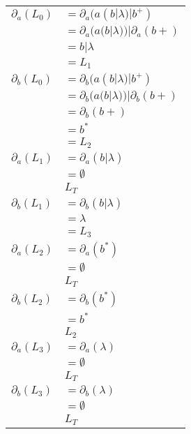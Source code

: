\subsubsection{}
\begin{tabular}{l l}
	$\partial_a(L_0)$ & $= \partial_a(a(b|\lambda)|b^+)$ \\
					  & $= \partial_a(a(b|\lambda)) | \partial_a(b+)$ \\
					  & $= b | \lambda $ \\
					  & $= L_1$ \\

	$\partial_b(L_0)$ & $= \partial_b(a(b|\lambda)|b^+)$ \\
					  & $= \partial_b(a(b|\lambda)) | \partial_b(b+)$ \\
					  & $= \partial_b(b+)$ \\
					  & $= b^*$ \\
					  & $= L_2$ \\

	$\partial_a(L_1)$ & $= \partial_a(b | \lambda)$ \\
					  & $= \emptyset$ \\
					  & $L_T$ \\

	$\partial_b(L_1)$ & $= \partial_b(b | \lambda)$ \\
					  & $= \lambda$ \\
					  & $= L_3$ \\

	$\partial_a(L_2)$ & $= \partial_a(b^*)$ \\
					  & $= \emptyset$ \\
					  & $L_T$ \\

	$\partial_b(L_2)$ & $= \partial_b(b^*)$ \\
					  & $= b^*$ \\
					  & $L_2$ \\

	$\partial_a(L_3)$ & $= \partial_a(\lambda)$ \\
					  & $= \emptyset$ \\
					  & $L_T$ \\

	$\partial_b(L_3)$ & $= \partial_b(\lambda)$ \\
					  & $= \emptyset$ \\
					  & $L_T$ \\
\end{tabular}

\subsection{}
